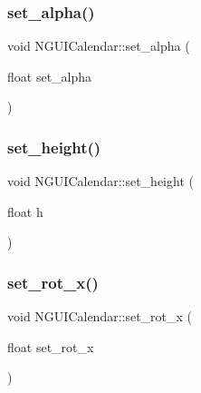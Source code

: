 \hypertarget{class_n_g_u_i_calendar_a731796a15cfb273a5cfb0fa61e72fbd4}{}\label{class_n_g_u_i_calendar_a731796a15cfb273a5cfb0fa61e72fbd4} 
\subsubsection{\texorpdfstring{set\+\_\+alpha()}{set\_alpha()}}
{\footnotesize\ttfamily void N\+G\+U\+I\+Calendar\+::set\+\_\+alpha (\begin{DoxyParamCaption}\item[{float}]{set\+\_\+alpha }\end{DoxyParamCaption})}

\hypertarget{class_n_g_u_i_calendar_a014d060bcff9cd658caf032088988923}{}\label{class_n_g_u_i_calendar_a014d060bcff9cd658caf032088988923} 
\subsubsection{\texorpdfstring{set\+\_\+height()}{set\_height()}}
{\footnotesize\ttfamily void N\+G\+U\+I\+Calendar\+::set\+\_\+height (\begin{DoxyParamCaption}\item[{float}]{h }\end{DoxyParamCaption})}

\hypertarget{class_n_g_u_i_calendar_a24294f6ba3bba20418bb58b9a5bee666}{}\label{class_n_g_u_i_calendar_a24294f6ba3bba20418bb58b9a5bee666} 
\subsubsection{\texorpdfstring{set\+\_\+rot\+\_\+x()}{set\_rot\_x()}}
{\footnotesize\ttfamily void N\+G\+U\+I\+Calendar\+::set\+\_\+rot\+\_\+x (\begin{DoxyParamCaption}\item[{float}]{set\+\_\+rot\+\_\+x }\end{DoxyParamCaption})}

\hypertarget{class_n_g_u_i_calendar_a8057e2ba5b3b7646effd2f301ef66e0c}{}\label{class_n_g_u_i_calendar_a8057e2ba5b3b7646effd2f301ef66e0c} 
